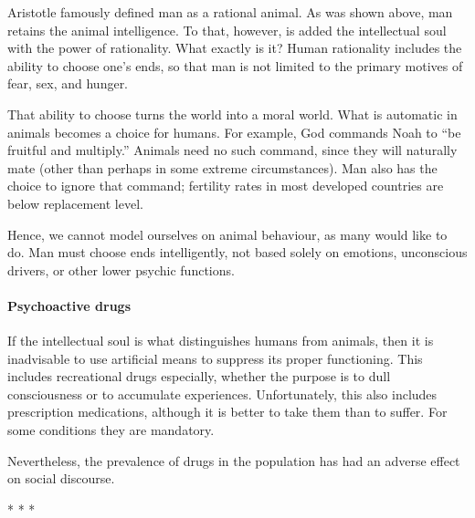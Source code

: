 Aristotle famously defined man as a rational animal. As was shown above, man retains the animal intelligence. To that, however, is added the intellectual soul with the power of rationality. What exactly is it? Human rationality includes the ability to choose one's ends, so that man is not limited to the primary motives of fear, sex, and hunger.

That ability to choose turns the world into a moral world. What is automatic in animals becomes a choice for humans. For example, God commands Noah to ``be fruitful and multiply.'' Animals need no such command, since they will naturally mate (other than perhaps in some extreme circumstances). Man also has the choice to ignore that command; fertility rates in most developed countries are below replacement level.

Hence, we cannot model ourselves on animal behaviour, as many would like to do. Man must choose ends intelligently, not based solely on emotions, unconscious drivers, or other lower psychic functions.

\paragraph{Psychoactive drugs}


If the intellectual soul is what distinguishes humans from animals, then it is inadvisable to use artificial means to suppress its proper functioning. This includes recreational drugs especially, whether the purpose is to dull consciousness or to accumulate experiences. Unfortunately, this also includes prescription medications, although it is better to take them than to suffer. For some conditions they are mandatory.

Nevertheless, the prevalence of drugs in the population has had an adverse effect on social discourse.



\begin{center}* * *\end{center}

